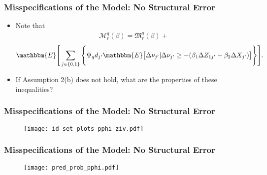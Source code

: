 \documentclass[notes=show]{beamer}
\begin{document}
\begin{frame}
\frametitle{Misspecifications of the Model: No Structural Error}

\begin{itemize}
	\item Note that
	\small
	\begin{align*}
	\mathcal{M}^{q}_{r}(\beta)=\mathfrak{M}^{q}_{r}(\beta)+
	\end{align*}
	\begin{align*}
	\mathbbm{E}\Bigg[\sum_{j\in\{0,1\}}\Bigg\{\Psi_{q}d_{j'}\mathbbm{E}\big[\Delta\nu_{j'}|\Delta\nu_{j'}\geq-(\beta_{1}\Delta Z_{1j'}+\beta_{2}\Delta X_{j'})\big]\Bigg\}\Bigg].
	\end{align*}
	\normalsize
	\item If Assumption 2(b) does not hold, what are the properties of these inequalities?
\end{itemize}
\end{frame}
\begin{frame}
\frametitle{Misspecifications of the Model: No Structural Error}

\begin{figure}[h!]
\centering \texttt{[image: id\_set\_plots\_pphi\_ziv.pdf]}
\end{figure}

\end{frame}

\begin{frame}
\frametitle{Misspecifications of the Model: No Structural Error}

\begin{figure}[h!]
\centering \texttt{[image: pred\_prob\_pphi.pdf]}
\end{figure}

\end{frame}
\end{document}
